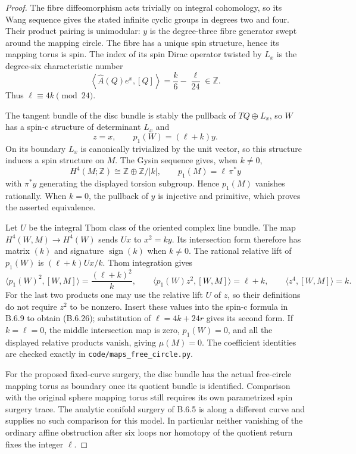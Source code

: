 \begin{proof}
The fibre diffeomorphism acts trivially on integral cohomology, so
its Wang sequence gives the stated infinite cyclic groups in
degrees two and four.  Their product pairing is unimodular:
$y$ is the degree-three fibre generator swept around the mapping
circle.  The fibre has a unique spin structure, hence its mapping
torus is spin.  The index of its spin Dirac operator twisted by
$L_x$ is the degree-six characteristic number
\[
 \left\langle \widehat A(Q)e^x,[Q]\right\rangle
    =\frac{k}{6}-\frac{\ell}{24}\in\mathbb Z.
\]
Thus $\ell\equiv4k\pmod {24}$.

The tangent bundle of the disc bundle is stably the pullback of
$TQ\oplus L_x$, so $W$ has a spin-c structure of determinant
$L_x$ and
\[
 z=x,\qquad p_1(W)=(\ell+k)y.
\]
On its boundary $L_x$ is canonically trivialized by the unit vector,
so this structure induces a spin structure on $M$.  The Gysin
sequence gives, when $k\ne0$,
\[
 H^4(M;\mathbb Z)\cong\mathbb Z\oplus\mathbb Z/|k|,
 \qquad p_1(M)=\ell\,\pi^*y
\]
with $\pi^*y$ generating the displayed torsion subgroup.  Hence
$p_1(M)$ vanishes rationally.  When $k=0$, the pullback of $y$
is injective and primitive, which proves the asserted equivalence.

Let $U$ be the integral Thom class of the oriented complex line
bundle.  The map $H^4(W,M)\to H^4(W)$ sends $Ux$ to $x^2=ky$.
Its intersection form therefore has matrix $(k)$ and signature
$\operatorname{sign}(k)$ when $k\ne0$.  The rational relative lift
of $p_1(W)$ is $(\ell+k)Ux/k$.  Thom integration gives
\[
 \langle p_1(W)^2,[W,M]\rangle=\frac{(\ell+k)^2}{k},\qquad
 \langle p_1(W)z^2,[W,M]\rangle=\ell+k,\qquad
 \langle z^4,[W,M]\rangle=k.
\]
For the last two products one may use the relative lift $U$ of
$z$, so their definitions do not require $z^2$ to be nonzero.
Insert these values into the spin-c formula in B.6.9 to obtain
(B.6.26); substitution of $\ell=4k+24r$ gives its second form.
If $k=\ell=0$, the middle intersection map is zero, $p_1(W)=0$,
and all the displayed relative products vanish, giving $\mu(M)=0$.
The coefficient identities are checked exactly in
\texttt{code/maps\_free\_circle.py}.

For the proposed fixed-curve surgery, the disc bundle has the actual
free-circle mapping torus as boundary once its quotient bundle is
identified.  Comparison with the original sphere mapping torus
still requires its own parametrized spin surgery trace.  The
analytic conifold surgery of B.6.5 is along a different curve and
supplies no such comparison for this model.  In particular neither
vanishing of the ordinary affine obstruction after six loops nor
homotopy of the quotient return fixes the integer $\ell$.
\end{proof}

